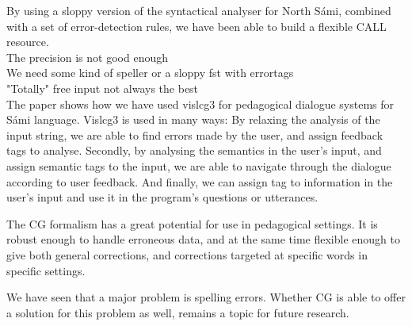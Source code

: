 \documentclass[11pt]{article}
\begin{document}
By using a sloppy version of the syntactical analyser for North Sámi, combined with a set of error-detection rules, we have been able to build a flexible CALL resource. \\ 
The precision is not good enough  \\
We need some kind of speller or a sloppy fst with errortags \\
"Totally" free input not always the best \\




The paper shows how we have used vislcg3 for pedagogical dialogue systems for Sámi language. Vislcg3 is used in many ways: By relaxing the analysis of the input string, we are able to find errors made by the user, and assign feedback tags to analyse. Secondly, by analysing the semantics in the user's input, and assign semantic tags to the input, we are able to navigate through the dialogue according to user feedback. And finally, we can assign tag to information in the user's input and use it in the program's questions or utterances.  

The CG formalism has a great potential for use in pedagogical settings.
It is robust enough to handle erroneous data, and at the same time flexible enough to give both general corrections, and corrections targeted at specific words in specific settings.

We have seen that a major problem is spelling errors. Whether CG is able to offer a solution for this problem as well, remains a topic for future research.
\end{document}
